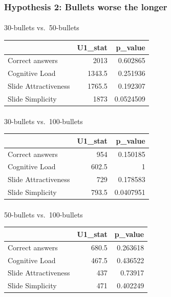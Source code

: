 \documentclass[
  letterpaper,
  DIV=11,
  numbers=noendperiod]{scrartcl}
\makeatletter
\let\oldparagraph\paragraph
\renewcommand{\paragraph}{
    \@ifstar
      \xxxParagraphStar
      \xxxParagraphNoStar
  }
\newcommand{\xxxParagraphStar}[1]{\oldparagraph*{#1}\mbox{}}
\newcommand{\xxxParagraphNoStar}[1]{\oldparagraph{#1}\mbox{}}
\newcounter{none} %
\makeatother
\begin{document}
\subsubsection{Hypothesis 2: Bullets worse the
longer}\label{hypothesis-2-bullets-worse-the-longer}

\paragraph{30-bullets vs.~50-bullets}\label{bullets-vs.-50-bullets}

{\def\LTcaptype{none} %
\begin{longtable}[]{@{}lrr@{}}
\toprule\noalign{}
& U1\_stat & p\_value \\
\midrule\noalign{}
\endhead
\bottomrule\noalign{}
\endlastfoot
Correct answers & 2013 & 0.602865 \\
Cognitive Load & 1343.5 & 0.251936 \\
Slide Attractiveness & 1765.5 & 0.192307 \\
Slide Simplicity & 1873 & 0.0524509 \\
\end{longtable}
}

\paragraph{30-bullets vs.~100-bullets}\label{bullets-vs.-100-bullets}

{\def\LTcaptype{none} %
\begin{longtable}[]{@{}lrr@{}}
\toprule\noalign{}
& U1\_stat & p\_value \\
\midrule\noalign{}
\endhead
\bottomrule\noalign{}
\endlastfoot
Correct answers & 954 & 0.150185 \\
Cognitive Load & 602.5 & 1 \\
Slide Attractiveness & 729 & 0.178583 \\
Slide Simplicity & 793.5 & 0.0407951 \\
\end{longtable}
}

\paragraph{50-bullets vs.~100-bullets}\label{bullets-vs.-100-bullets-1}

{\def\LTcaptype{none} %
\begin{longtable}[]{@{}lrr@{}}
\toprule\noalign{}
& U1\_stat & p\_value \\
\midrule\noalign{}
\endhead
\bottomrule\noalign{}
\endlastfoot
Correct answers & 680.5 & 0.263618 \\
Cognitive Load & 467.5 & 0.436522 \\
Slide Attractiveness & 437 & 0.73917 \\
Slide Simplicity & 471 & 0.402249 \\
\end{longtable}
}
\end{document}
